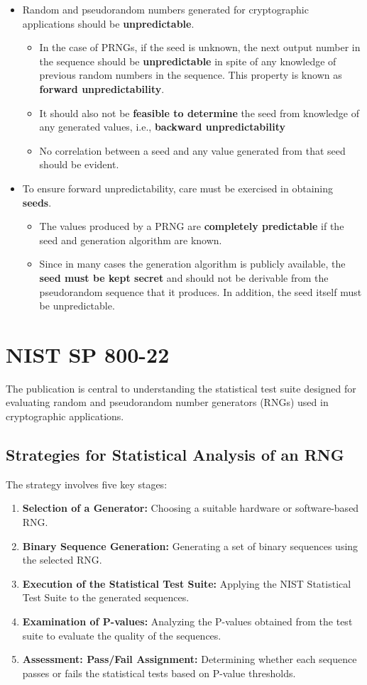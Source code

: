 \documentclass[12pt,openany]{book}
\theoremstyle{definition}
\begin{document}
\begin{itemize}
	\item Random and pseudorandom numbers generated for cryptographic applications should be \textbf{unpredictable}. \begin{itemize}
		\item In the case of PRNGs, if the seed is unknown, the next output number in the sequence should be \textbf{unpredictable} in spite of any knowledge of previous random numbers in the sequence. This property is known as \textbf{forward unpredictability}.
		\item It should also not be \textbf{feasible to determine} the seed from knowledge of any generated values, i.e., \textbf{backward unpredictability}
		\item No correlation between a seed and any value generated from that seed should be evident.
	\end{itemize}
	\item To ensure forward unpredictability, care must be exercised in obtaining \textbf{seeds}.
	\begin{itemize}
		\item The values produced by a PRNG are \textbf{completely predictable} if the seed and generation algorithm are known.
		\item Since in many cases the generation algorithm is publicly available, the \textbf{seed must be kept secret} and should not be derivable from the pseudorandom sequence that it produces. In addition, the seed itself must be unpredictable.
	\end{itemize}
\end{itemize}
	\newpage
	\section{NIST SP 800-22}
	The publication is central to understanding the statistical test suite designed for evaluating random and pseudorandom number generators (RNGs) used in cryptographic applications.
	
	\subsection*{Strategies for Statistical Analysis of an RNG}
	The strategy involves five key stages:
	\begin{enumerate}
		\item \textbf{Selection of a Generator:} Choosing a suitable hardware or software-based RNG.
		\item \textbf{Binary Sequence Generation:} Generating a set of binary sequences using the selected RNG.
		\item \textbf{Execution of the Statistical Test Suite:} Applying the NIST Statistical Test Suite to the generated sequences.
		\item \textbf{Examination of P-values:} Analyzing the P-values obtained from the test suite to evaluate the quality of the sequences.
		\item \textbf{Assessment: Pass/Fail Assignment:} Determining whether each sequence passes or fails the statistical tests based on P-value thresholds.
	\end{enumerate}
	
\end{document}

